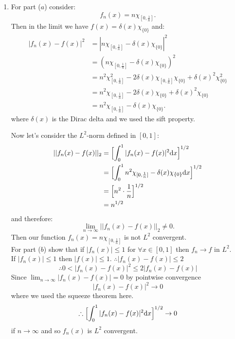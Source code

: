 \begin{enumerate}
    \item For part ($a$) consider:
    $$f_n(x)=n\chi_{[0,\frac{1}{n}]}.$$
    Then in the limit we have $f(x)=\delta(x)\chi_{\{0\}}$ and:
    \begin{align*}
        |f_n(x)-f(x)|^2
        &=|n\chi_{[0,\frac{1}{n}]}-\delta(x)\chi_{\{0\}}|^2 \\
        &=(n\chi_{[0,\frac{1}{n}]}-\delta(x)\chi_{\{0\}})^2 \\
        &=n^2\chi_{[0,\frac{1}{n}]}^2
        -2\delta(x)\chi_{[0,\frac{1}{n}]}\chi_{\{0\}}
        +\delta(x)^2\chi_{\{0\}}^2 \\
        &=n^2\chi_{[0,\frac{1}{n}]}
        -2\delta(x)\chi_{\{0\}}+\delta(x)^2\chi_{\{0\}} \\
        &=n^2\chi_{[0,\frac{1}{n}]}
        -\delta(x)\chi_{\{0\}}.
    \end{align*}
    where $\delta(x)$ is the Dirac delta and we used the sift property.

    Now let's consider the $L^2$-norm defined in $[0,1]$:
    \begin{align*}
        ||f_n(x)-f(x)||_2
        &=\Bigl[\int_{0}^{1}
        |f_n(x)-f(x)|^2 \dd x
        \Bigr]^{1/2} \\
        &=\Bigl[\int_{0}^{1}n^2
        \chi_{[0,\frac{1}{n}]}
        -\delta(x)\chi_{\{0\}}
        \dd x\Bigr]^{1/2} \\
        &=\Bigl[n^2\cdot\frac{1}{n}\Bigr]^{1/2} \\
        &=n^{1/2}
    \end{align*}
    and therefore:
    $$\lim_{n\rightarrow\infty}||f_n(x)-f(x)||_2
    \neq0.$$
    Then our function $f_n(x)=n\chi_{[0,\frac{1}{n}]}$
    is not $L^2$ convergent. \\

    For part ($b$) show that if $|f_n(x)|\leq1$
    for $\forall x\in[0,1]$ then $f_n\rightarrow f$
    in $L^2$. \\

    If $|f_n(x)|\leq1$ then $|f(x)|\leq1$.
    $\therefore |f_n(x)-f(x)|\leq2$
    $$\therefore 0<|f_n(x)-f(x)|^2\leq2|f_n(x)-f(x)|$$
    Since $\displaystyle\lim_{n\rightarrow\infty}
    |f_n(x)-f(x)|=0$ by pointwise convergence
    $$|f_n(x)-f(x)|^2\rightarrow0$$
    where we used the squeeze theorem here.
    $$\therefore\Bigl[\int_{0}^{1}
    |f_n(x)-f(x)|^2 \dd x
    \Bigr]^{1/2}\rightarrow0$$
    if $n\rightarrow\infty$
    and so $f_n(x)$ is $L^2$ convergent.


\end{enumerate}